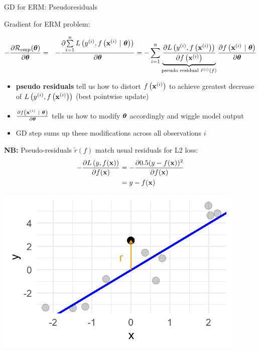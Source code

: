 \documentclass[11pt,compress,t,notes=noshow, xcolor=table]{beamer}
\begin{document}
\begin{vbframe}{GD for ERM: Pseudoresiduals}

\begin{footnotesize}

Gradient for ERM problem: 

\vspace*{-0.5cm}

\begin{eqnarray*}
- \frac{\partial{\mathcal{R}_{\text{emp}}(\bm{\theta})}}{\partial \bm{\theta}} &=& - \frac{\partial{\sum\limits_{i=1}^nL\left(y^{(i)}, f\left(\mathbf{x}^{(i)} ~|~ \bm{\theta}\right)\right)}}{\partial \bm{\theta}}= - \sum\limits_{i=1}^n \underbrace{\frac{\partial{L\left(y^{(i)}, f\left(\mathbf{x}^{(i)}\right)\right)}}{\partial f\left(\mathbf{x}^{(i)}\right)}}_{\text{pseudo residual } \tilde r^{(i)}(f)} \frac{\partial{f\left(\mathbf{x}^{(i)} ~|~ \bm{\theta}\right)}}{\partial \bm{\theta}}
\end{eqnarray*}

\vspace*{-0.5cm}

\begin{itemize}
	\item \textbf{pseudo residuals} tell us how to distort $f\left(\mathbf{x}^{(i)}\right)$ to achieve greatest decrease of $L\left(y^{(i)}, f\left(\mathbf{x}^{(i)}\right)\right)$ (best pointwise update)
	\item $\frac{\partial{f\left(\mathbf{x}^{(i)} ~|~ \bm{\theta}\right)}}{\partial \bm{\theta}}$ tells us how to modify $\bm{\theta}$ accordingly and wiggle model output
	\item GD step sums up these modifications across all observations $i$
\end{itemize}

\begin{minipage}[b]{0.45\textwidth}
  \textbf{NB:} Pseudo-residuals 
  $\tilde{r}\left( f \right)$ 
  match usual residuals for L2 loss:
  \begin{align*}
  - \frac{\partial{L\left(y, f(\mathbf{x})\right)}}{\partial f(\mathbf{x})} & = - \frac{\partial{0.5(y - f(\mathbf{x}))^2}}{\partial f(\mathbf{x})}\\ 
                   & = y - f(\mathbf{x})
  \end{align*}
\end{minipage}%
\begin{minipage}[b]{0.05\textwidth}
   \phantom{foo}
\end{minipage}
\begin{minipage}[b]{0.45\textwidth}
  \includegraphics[width=0.9\textwidth]{figure_man/pseudo_residual_1.png}
\end{minipage}

\end{footnotesize}


\end{vbframe}


\endlecture
\end{document}
